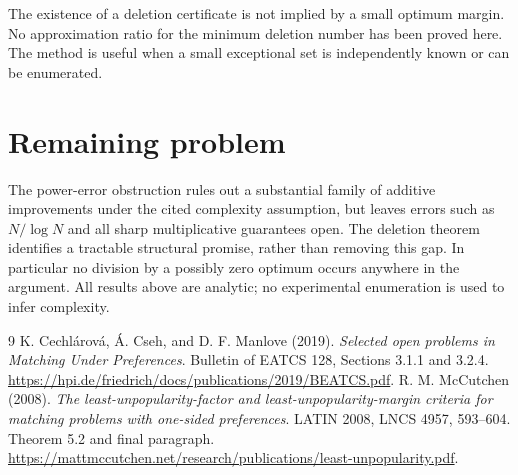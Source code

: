 \documentclass[11pt]{article}
\theoremstyle{remark}
\begin{document}
The existence of a deletion certificate is not implied by a small
optimum margin. No approximation ratio for the minimum deletion number
has been proved here. The method is useful when a small exceptional
set is independently known or can be enumerated.

\section{Remaining problem}
The power-error obstruction rules out a substantial family of additive
improvements under the cited complexity assumption, but leaves errors
such as $N/\log N$ and all sharp multiplicative guarantees open.
The deletion theorem identifies a tractable structural promise, rather
than removing this gap. In particular no division by a possibly zero
optimum occurs anywhere in the argument. All results above are analytic;
no experimental enumeration is used to infer complexity.
\begin{thebibliography}{9}
 K. Cechl\'arov\'a, \'A. Cseh, and D. F. Manlove (2019).
\emph{Selected open problems in Matching Under Preferences}.
Bulletin of EATCS 128, Sections 3.1.1 and 3.2.4.
\url{https://hpi.de/friedrich/docs/publications/2019/BEATCS.pdf}.
 R. M. McCutchen (2008).
\emph{The least-unpopularity-factor and least-unpopularity-margin
criteria for matching problems with one-sided preferences}.
LATIN 2008, LNCS 4957, 593--604. Theorem 5.2 and final paragraph.
\url{https://mattmccutchen.net/research/publications/least-unpopularity.pdf}.
\end{thebibliography}
\end{document}
